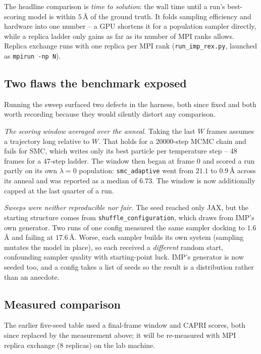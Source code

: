 \documentclass[11pt]{article}
\begin{document}
The headline comparison is \emph{time to solution}: the wall time until a
run's best-scoring model is within $5$\,\AA{} of the ground truth. It folds
sampling efficiency and hardware into one number -- a GPU shortens it for a
population sampler directly, while a replica ladder only gains as far as its
number of MPI ranks allows. Replica exchange runs with one replica per MPI
rank (\texttt{run\_imp\_rex.py}, launched as \texttt{mpirun -np N}).

\subsection{Two flaws the benchmark exposed}

Running the sweep surfaced two defects in the harness, both since fixed and
both worth recording because they would silently distort any comparison.

\emph{The scoring window averaged over the anneal.} Taking the last $W$
frames assumes a trajectory long relative to $W$. That holds for a 20000-step
MCMC chain and fails for SMC, which writes only its best particle per
temperature step -- 48 frames for a 47-step ladder. The window then began at
frame 0 and scored a run partly on its own $\lambda = 0$ population:
\texttt{smc\_adaptive} went from $21.1$ to $0.9$\,\AA{} across its anneal and
was reported as a median of $6.73$. The window is now additionally capped at
the last quarter of a run.

\emph{Sweeps were neither reproducible nor fair.} The seed reached only JAX,
but the starting structure comes from \texttt{shuffle\_configuration}, which
draws from IMP's own generator. Two runs of one config measured the same
sampler docking to $1.6$\,\AA{} and failing at $17.6$\,\AA. Worse, each
sampler builds its own system (sampling mutates the model in place), so each
received a \emph{different} random start, confounding sampler quality with
starting-point luck. IMP's generator is now seeded too, and a config takes a
list of seeds so the result is a distribution rather than an anecdote.

\subsection{Measured comparison}

The earlier five-seed table used a final-frame window and CAPRI scores, both
since replaced by the measurement above; it will be re-measured with MPI
replica exchange ($8$ replicas) on the lab machine.
\end{document}
